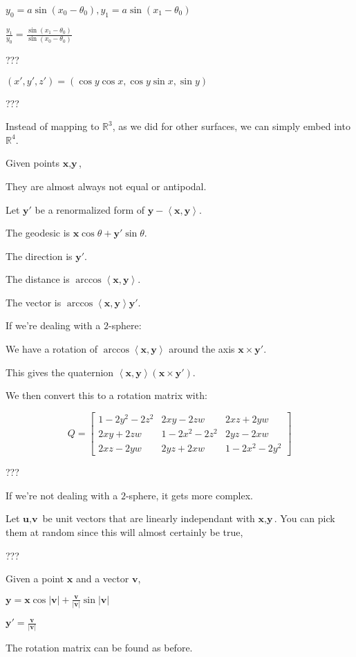 \documentclass[12pt]{amsart}
\begin{document}
$y_0 = a\sin(x_0-\theta_0), y_1 = a\sin(x_1-\theta_0)$

$\frac{y_1}{y_0} = \frac{\sin(x_1-\theta_0)}{\sin(x_0-\theta_0)}$

???

$(x',y',z') = (\cos y \cos x, \cos y \sin x, \sin y)$

???

Instead of mapping to $\mathbb{R}^3$, as we did for other surfaces, we can simply embed into $\mathbb{R}^4$.


Given points $\textbf{x}, \textbf{y}$,

They are almost always not equal or antipodal.

Let $\textbf{y}'$ be a renormalized form of $\textbf{y}-\left<\textbf{x},\textbf{y}\right>$.

The geodesic is $\textbf{x}\cos\theta+\textbf{y}'\sin\theta$.

The direction is $\textbf{y}'$.

The distance is $\arccos\left<\textbf{x},\textbf{y}\right>$.

The vector is $\arccos\left<\textbf{x},\textbf{y}\right>\textbf{y}'$.

If we're dealing with a $2$-sphere:

We have a rotation of $\arccos\left<\textbf{x},\textbf{y}\right>$ around the axis $\textbf{x} \times \textbf{y}'$.

This gives the quaternion $\left<\textbf{x},\textbf{y}\right>(\textbf{x} \times \textbf{y}')$.

We then convert this to a rotation matrix with:

$$Q = \begin{bmatrix}
    1 - 2 y^2 - 2 z^2 & 2 x y - 2 z w & 2 x z + 2 y w \\
    2 x y + 2 z w & 1 - 2 x^2 - 2 z^2 & 2 y z - 2 x w \\
    2 x z - 2 y w & 2 y z + 2 x w & 1 - 2 x^2 - 2 y^2
\end{bmatrix}$$

???

If we're not dealing with a $2$-sphere, it gets more complex.

Let $\textbf{u}, \textbf{v}$ be unit vectors that are linearly independant with $\textbf{x}, \textbf{y}$. You can pick them at random since this will almost certainly be true, 

???

Given a point $\textbf{x}$ and a vector $\textbf{v}$,

$\textbf{y} = \textbf{x}\cos|\textbf{v}|+\frac{\textbf{v}}{|\textbf{v}|}\sin|\textbf{v}|$

$\textbf{y}' = \frac{\textbf{v}}{|\textbf{v}|}$

The rotation matrix can be found as before.
\end{document}
